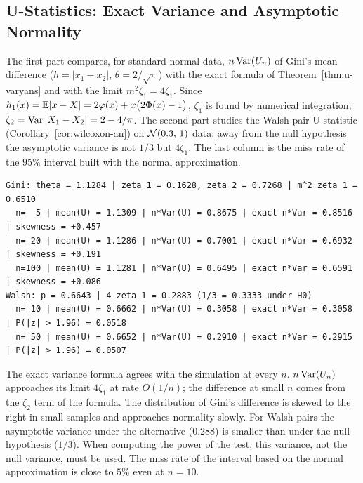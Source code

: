 \documentclass[main.tex]{subfiles}
\begin{document}
\subsection{U-Statistics: Exact Variance and Asymptotic Normality}\label{sec:u-istatistik}
The first part compares, for standard normal data, $n\operatorname{Var}(U_n)$ of Gini's mean difference ($h=|x_1-x_2|$, $\theta=2/\sqrt\pi$) with the exact formula of Theorem~\ref{thm:u-varyans} and with the limit $m^2\zeta_1=4\zeta_1$. Since $h_1(x)=\mathbb{E}|x-X|=2\varphi(x)+x\big(2\Phi(x)-1\big)$, $\zeta_1$ is found by numerical integration; $\zeta_2=\operatorname{Var}|X_1-X_2|=2-4/\pi$. The second part studies the Walsh-pair U-statistic (Corollary~\ref{cor:wilcoxon-an}) on $\mathcal{N}(0.3,\,1)$ data: away from the null hypothesis the asymptotic variance is not $1/3$ but $4\zeta_1$. The last column is the miss rate of the $95\%$ interval built with the normal approximation.

\begin{lstlisting}[style=output]
Gini: theta = 1.1284 | zeta_1 = 0.1628, zeta_2 = 0.7268 | m^2 zeta_1 = 0.6510
  n=  5 | mean(U) = 1.1309 | n*Var(U) = 0.8675 | exact n*Var = 0.8516 | skewness = +0.457
  n= 20 | mean(U) = 1.1286 | n*Var(U) = 0.7001 | exact n*Var = 0.6932 | skewness = +0.191
  n=100 | mean(U) = 1.1281 | n*Var(U) = 0.6495 | exact n*Var = 0.6591 | skewness = +0.086
Walsh: p = 0.6643 | 4 zeta_1 = 0.2883 (1/3 = 0.3333 under H0)
  n= 10 | mean(U) = 0.6662 | n*Var(U) = 0.3058 | exact n*Var = 0.3058 | P(|z| > 1.96) = 0.0518
  n= 50 | mean(U) = 0.6652 | n*Var(U) = 0.2910 | exact n*Var = 0.2915 | P(|z| > 1.96) = 0.0507
\end{lstlisting}

The exact variance formula agrees with the simulation at every $n$. $n\operatorname{Var}(U_n)$ approaches its limit $4\zeta_1$ at rate $O(1/n)$; the difference at small $n$ comes from the $\zeta_2$ term of the formula. The distribution of Gini's difference is skewed to the right in small samples and approaches normality slowly. For Walsh pairs the asymptotic variance under the alternative ($0.288$) is smaller than under the null hypothesis ($1/3$). When computing the power of the test, this variance, not the null variance, must be used. The miss rate of the interval based on the normal approximation is close to $5\%$ even at $n=10$.
\end{document}
